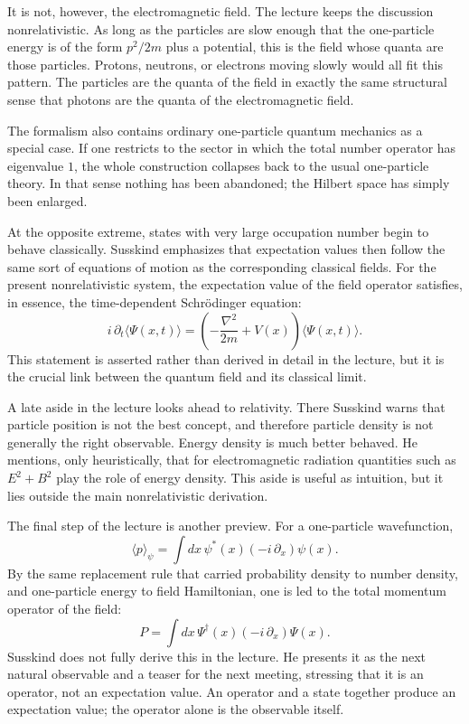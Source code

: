 It is not, however, the electromagnetic field. The lecture keeps the discussion nonrelativistic. As long as the particles are slow enough that the one-particle energy is of the form $p^2/2m$ plus a potential, this is the field whose quanta are those particles. Protons, neutrons, or electrons moving slowly would all fit this pattern. The particles are the quanta of the field in exactly the same structural sense that photons are the quanta of the electromagnetic field.

The formalism also contains ordinary one-particle quantum mechanics as a special case. If one restricts to the sector in which the total number operator has eigenvalue $1$, the whole construction collapses back to the usual one-particle theory. In that sense nothing has been abandoned; the Hilbert space has simply been enlarged.

At the opposite extreme, states with very large occupation number begin to behave classically. Susskind emphasizes that expectation values then follow the same sort of equations of motion as the corresponding classical fields. For the present nonrelativistic system, the expectation value of the field operator satisfies, in essence, the time-dependent Schr\"odinger equation:
\begin{equation}
i\,\partial_t\langle\Psi(x,t)\rangle
=
\left(-\frac{\nabla^2}{2m}+V(x)\right)\langle\Psi(x,t)\rangle.
\end{equation}
This statement is asserted rather than derived in detail in the lecture, but it is the crucial link between the quantum field and its classical limit.

A late aside in the lecture looks ahead to relativity. There Susskind warns that particle position is not the best concept, and therefore particle density is not generally the right observable. Energy density is much better behaved. He mentions, only heuristically, that for electromagnetic radiation quantities such as $E^2+B^2$ play the role of energy density. This aside is useful as intuition, but it lies outside the main nonrelativistic derivation.

The final step of the lecture is another preview. For a one-particle wavefunction,
\begin{equation}
\langle p\rangle_\psi
=
\int dx\,\psi^*(x)\left(-i\,\partial_x\right)\psi(x).
\end{equation}
By the same replacement rule that carried probability density to number density, and one-particle energy to field Hamiltonian, one is led to the total momentum operator of the field:
\begin{equation}
P=\int dx\,\Psi^\dagger(x)\left(-i\,\partial_x\right)\Psi(x).
\end{equation}
Susskind does not fully derive this in the lecture. He presents it as the next natural observable and a teaser for the next meeting, stressing that it is an operator, not an expectation value. An operator and a state together produce an expectation value; the operator alone is the observable itself.

